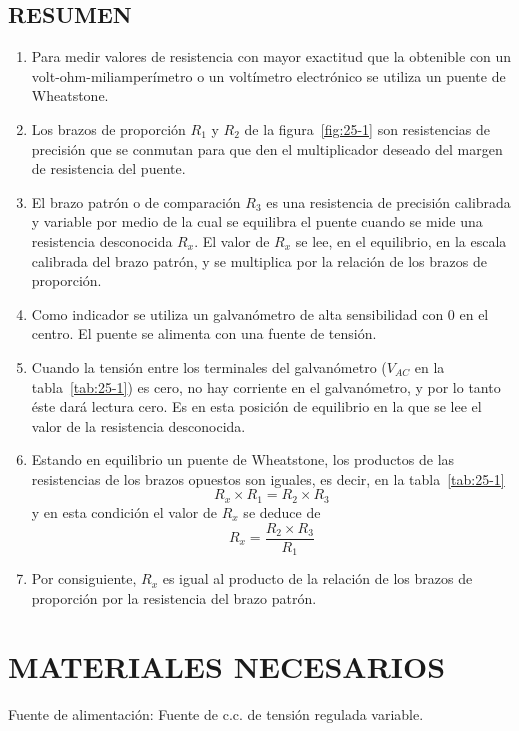 \documentclass{article}
\numberwithin{equation}{subsection}
\numberwithin{figure}{section}
\numberwithin{table}{section}
\begin{document}
\subsection{RESUMEN}
\begin{enumerate}
    \item Para medir valores de resistencia con mayor exactitud que la obtenible con un volt-ohm-miliamperímetro 
    o un voltímetro electrónico se utiliza un puente de Wheatstone.
    \item Los brazos de proporción $R_1$ y $R_2$ de la figura~\ref{fig:25-1} son resistencias de precisión que se 
    conmutan para que den el multiplicador deseado del margen de resistencia del puente.
    \item El brazo patrón o de comparación $R_3$ es una resistencia de precisión calibrada y variable por medio de 
    la cual se equilibra el puente cuando se mide una resistencia desconocida $R_x$. El valor de $R_x$ se lee, en 
    el equilibrio, en la escala calibrada del brazo patrón, y se multiplica por la relación de los brazos 
    de proporción.
    \item Como indicador se utiliza un galvanómetro de alta sensibilidad con 0 en el centro. El puente se alimenta 
    con una fuente de tensión.
    \item Cuando la tensión entre los terminales del galvanómetro ($V_{AC}$ en la tabla~\ref{tab:25-1}) es cero, no 
    hay corriente en el galvanómetro, y por lo tanto éste dará lectura cero. Es en esta posición de equilibrio en 
    la que se lee el valor de la resistencia desconocida.
    \item Estando en equilibrio un puente de Wheatstone, los productos de las resistencias de los brazos opuestos son 
    iguales, es decir, en la tabla~\ref{tab:25-1}
    \begin{equation} R_x \times R_1 = R_2 \times R_3 \label{eq:resumen_1} \end{equation}
    y en esta condición el valor de $R_x$ se deduce de
    \begin{equation} R_x = \frac{R_2 \times R_3}{R_1} \label{eq:resumen_2} \end{equation}
    \item Por consiguiente, $R_x$ es igual al producto de la relación de los brazos de proporción por la resistencia 
    del brazo patrón.
\end{enumerate}

\newpage

\section{MATERIALES NECESARIOS}
Fuente de alimentación: Fuente de c.c. de tensión regulada variable.
\end{document}
